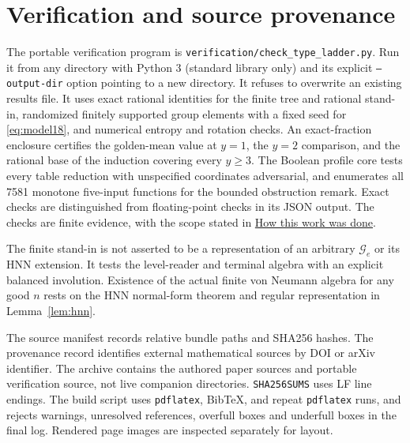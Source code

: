 
\section{Verification and source provenance}\label{sec:repro}
The portable verification program is
\texttt{verification/check\_type\_ladder.py}.
Run it from any directory with Python 3 (standard library only) and its explicit
\texttt{--output-dir} option pointing to a new directory.
It refuses to overwrite an existing results file.
It uses exact rational identities for the finite tree and rational
stand-in, randomized finitely supported group elements with a fixed
seed for \eqref{eq:model18}, and numerical entropy and rotation checks. An exact-fraction enclosure
certifies the golden-mean value at $y=1$, the $y=2$ comparison, and
the rational base of the induction covering every $y\geq3$.
The Boolean profile core tests every table reduction with unspecified
coordinates adversarial, and enumerates all 7581 monotone five-input
functions for the bounded obstruction remark.
Exact checks are distinguished from floating-point checks in its JSON
output. The checks are finite evidence, with the scope stated in
\hyperref[sec:methods]{How this work was done}.

The finite stand-in is not asserted to be a representation of an
arbitrary $\mathcal G_e$ or its HNN extension. It tests the level-reader and
terminal algebra with an explicit balanced involution.
Existence of the actual finite von Neumann algebra for any good $n$
rests on the HNN normal-form theorem and regular representation in
Lemma~\ref{lem:hnn}.

The source manifest records relative bundle paths and SHA256 hashes.
The provenance record identifies external mathematical sources by
DOI or arXiv identifier. The archive contains the authored
paper sources and portable verification source, not live companion
directories. \texttt{SHA256SUMS} uses LF line endings.
The build script uses \texttt{pdflatex}, BibTeX, and repeat
\texttt{pdflatex} runs, and rejects warnings, unresolved references,
overfull boxes and underfull boxes in the final log.
Rendered page images are inspected separately for layout.
